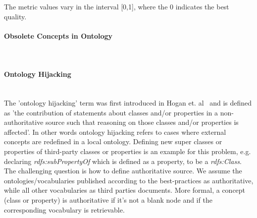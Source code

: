 The metric values vary in the interval [0,1], where  the 0 indicates the best quality.


\paragraph{Obsolete Concepts in Ontology} ~\\


\paragraph{Ontology Hijacking}  ~\\

The 'ontology hijacking' term was first introduced in Hogan et. al~\cite{Hogan08} and is defined as 'the contribution of statements about classes and/or properties in a non-authoritative source such that reasoning on those classes and/or properties is affected'. 
In other words ontology hijacking refers to cases where external concepts are redefined in a local ontology.
Defining new super classes or properties of third-party classes or properties is an example for this problem, e.g. declaring \textit{rdfs:subPropertyOf} which is defined as a property,  to be a \textit{rdfs:Class}. 
The challenging question is how to define authoritative source.
We assume the ontologies/vocabularies published according to the best-practices as authoritative, while all other vocabularies as third parties documents.
More formal, a concept (class or property) is authoritative if it's not a blank node and if the corresponding vocabulary is retrievable.
